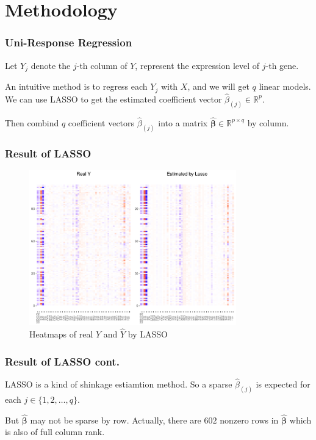 \section{Methodology}
\begin{frame}
    \sectionpage
\end{frame}

\begin{frame}
    \frametitle{Uni-Response Regression}

    Let $Y_j$ denote the $j$-th column of $Y$, represent the expression level of $j$-th gene. 

    An intuitive method is to regress each $Y_j$ with $X$, and we will get $q$ linear models. 
    We can use LASSO to get the estimated coefficient vector $\hat{\beta}_{(j)}\in\mathbb{R}^{p}$. 
    
    Then combind $q$ coefficient vectors $\hat{\beta}_{(j)}$ into a matrix $\hat{\boldsymbol{\beta}}\in\mathbb{R}^{p\times q}$ by column. 
\end{frame}

\begin{frame}
    \frametitle{Result of LASSO}

    \begin{figure}[h]
        \centering
        \includegraphics[width=0.8\textwidth]{./figs/heatmap_lasso.pdf}
        \caption{Heatmaps of real $Y$ and $\hat{Y}$ by LASSO}
    \end{figure}
\end{frame}

\begin{frame}
    \frametitle{Result of LASSO cont.}
    LASSO is a kind of shinkage estiamtion method. 
    So a sparse $\hat{\beta}_{(j)}$ is expected for each $j\in\{ 1,2,\dots,q \}$. 

    But $\hat{\boldsymbol{\beta}}$ may not be sparse by row. 
    Actually, there are $602$ nonzero rows in $\hat{\boldsymbol{\beta}}$ which is also of full column rank. 
\end{frame}

